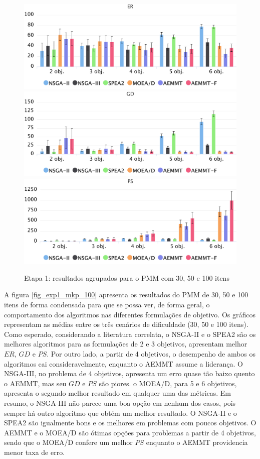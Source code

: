 \begin{figure}[!htbp]
	\caption{Etapa 1: resultados agrupados para o PMM com 30, 50 e 100 itens}
	\label{fig_exp1_mkp_todos}
	\includegraphics[width=1\textwidth]{cap_experimentos/figs/etapa1/er-mkp-todos}
	\includegraphics[width=1\textwidth]{cap_experimentos/figs/etapa1/gd-mkp-todos}
	\includegraphics[width=1\textwidth]{cap_experimentos/figs/etapa1/ps-mkp-todos}
\end{figure}

A figura \ref{fig_exp1_mkp_100} apresenta os resultados do PMM de 30, 50 e 100 itens de forma condensada para que se possa ver, de forma geral, o comportamento dos algoritmos nas diferentes formulações de objetivo. Os gráficos representam as médias entre os três cenários de dificuldade (30, 50 e 100 itens). Como esperado, considerando a literatura correlata, o NSGA-II e o SPEA2 são os melhores algoritmos para as formulações de 2 e 3 objetivos, apresentam melhor $ER$, $GD$ e $PS$. Por outro lado, a partir de 4 objetivos, o desempenho de ambos os algoritmos cai consideravelmente, enquanto o AEMMT assume a liderança. O NSGA-III, no problema de 4 objetivos, apresenta um erro quase tão baixo quento o AEMMT, mas seu $GD$ e $PS$ são piores. o MOEA/D, para 5 e 6 objetivos, apresenta o segundo melhor resultado em qualquer uma das métricas. Em resumo, o NSGA-III não parece uma boa opção em nenhum dos casos, pois sempre há outro algoritmo que obtém um melhor resultado. O NSGA-II e o SPEA2 são igualmente bons e os melhores em problemas com poucos objetivos. O AEMMT e o MOEA/D são ótimas opções para problemas a partir de 4 objetivos, sendo que o MOEA/D confere um melhor $PS$ enquanto o AEMMT providencia menor taxa de erro.

